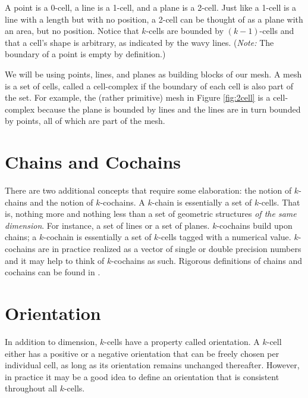 A point is a 0-cell, a line is a 1-cell, and a plane is a 2-cell. Just like a 1-cell is a line with a length but with no position, a 2-cell can be thought of as a plane with an area, but no position. Notice that $k$-cells are bounded by $(k-1)$-cells and that a cell's shape is arbitrary, as indicated by the wavy lines. (\textit{Note:} The boundary of a point is empty by definition.)

We will be using points, lines, and planes as building blocks of our mesh. A mesh is a set of cells, called a cell-complex if the boundary of each cell is also part of the set. For example, the (rather primitive) mesh in Figure \ref{fig:2cell} is a cell-complex because the plane is bounded by lines and the lines are in turn bounded by points, all of which are part of the mesh.

\section{Chains and Cochains}

There are two additional concepts that require some elaboration: the notion of $k$-chains and the notion of $k$-cochains. A $k$-chain is essentially a set of $k$-cells. That is, nothing more and nothing less than a set of geometric structures \emph{of the same dimension}. For instance, a set of lines or a set of planes. $k$-cochains build upon chains; a $k$-cochain is essentially a set of $k$-cells tagged with a numerical value. $k$-cochains are in practice realized as a vector of single or double precision numbers and it may help to think of $k$-cochains as such. Rigorous definitions of chains and cochains can be found in \parencite{gerritsma2014computational}.
 
\section{Orientation}

In addition to dimension, $k$-cells have a property called orientation. A $k$-cell either has a positive or a negative orientation that can be freely chosen per individual cell, as long as its orientation remains unchanged thereafter. However, in practice it may be a good idea to define an orientation that is consistent throughout all $k$-cells.


